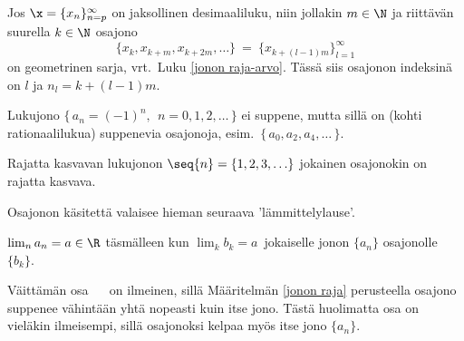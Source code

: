 \begin{Exa} Jos $\x = \{x_n\}_{n=p}^{\infty}$ on jaksollinen desimaaliluku, niin jollakin
$m \in \N$ ja riittävän suurella $k \in \N$ osajono
\[
\{x_k, x_{k+m}, x_{k+2m}, \ldots \}\ =\ \{x_{k+(l-1)m}\}_{l=1}^{\infty}
\]
on geometrinen sarja, vrt.\ Luku \ref{jonon raja-arvo}. Tässä siis osajonon indeksinä on $l$ ja
$n_l = k + (l-1)m$. \loppu 
\end{Exa}
\begin{Exa} Lukujono $\{\,a_n = (-1)^n,\ \ n=0,1,2, \ldots\,\}$ ei suppene, mutta sillä on
(kohti rationaalilukua) suppenevia osajonoja, esim.\ $\{\,a_0, a_2, a_4, \ldots\,\}$. \loppu 
\end{Exa}
\begin{Exa} Rajatta kasvavan lukujonon $\seq{n} = \{1,2,3,\ldots\}$ jokainen osajonokin on
rajatta kasvava. \loppu
\end{Exa}
Osajonon käsitettä valaisee hieman seuraava 'lämmittelylause'.
\begin{Lause} \label{suppenevat osajonot} $\lim_na_n=a\in\R$ täsmälleen kun $\lim_k b_k = a\,$
jokaiselle jonon $\{a_n\}$ osajonolle $\{b_k\}$.
\end{Lause}
\tod Väittämän osa \ \fbox{$\impl$} \ on ilmeinen, sillä Määritelmän \ref{jonon raja} 
perusteella osajono suppenee vähintään yhtä nopeasti kuin itse jono. Tästä huolimatta osa 
\fbox{$\limp$} on vieläkin ilmeisempi, sillä osajonoksi kelpaa myös itse jono $\{a_n\}$. \loppu


